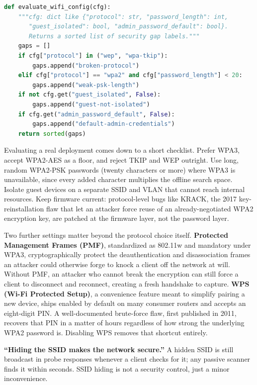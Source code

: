 \begin{lstlisting}[language=Python, caption={Evaluating a Wi-Fi configuration against baseline security criteria}]
def evaluate_wifi_config(cfg):
    """cfg: dict like {"protocol": str, "password_length": int,
       "guest_isolated": bool, "admin_password_default": bool}.
       Returns a sorted list of security gap labels."""
    gaps = []
    if cfg["protocol"] in ("wep", "wpa-tkip"):
        gaps.append("broken-protocol")
    elif cfg["protocol"] == "wpa2" and cfg["password_length"] < 20:
        gaps.append("weak-psk-length")
    if not cfg.get("guest_isolated", False):
        gaps.append("guest-not-isolated")
    if cfg.get("admin_password_default", False):
        gaps.append("default-admin-credentials")
    return sorted(gaps)
\end{lstlisting}

Evaluating a real deployment comes down to a short checklist. Prefer WPA3, accept WPA2-AES as a
floor, and reject TKIP and WEP outright. Use long, random WPA2-PSK passwords (twenty characters or
more) where WPA3 is unavailable, since every added character multiplies the offline search space.
Isolate guest devices on a separate SSID and VLAN that cannot reach internal resources. Keep
firmware current: protocol-level bugs like KRACK, the 2017 key-reinstallation flaw that let an
attacker force reuse of an already-negotiated WPA2 encryption key, are patched at the firmware
layer, not the password layer.

Two further settings matter beyond the protocol choice itself. \textbf{Protected Management Frames
(PMF)}, standardized as 802.11w and mandatory under WPA3, cryptographically protect the
deauthentication and disassociation frames an attacker could otherwise forge to knock a client off
the network at will. Without PMF, an attacker who cannot break the encryption can still force a
client to disconnect and reconnect, creating a fresh handshake to capture. \textbf{WPS (Wi-Fi
Protected Setup)}, a convenience feature meant to simplify pairing a new device, ships enabled by
default on many consumer routers and accepts an eight-digit PIN. A well-documented brute-force flaw,
first published in 2011, recovers that PIN in a matter of hours regardless of how strong the
underlying WPA2 password is. Disabling WPS removes that shortcut entirely.

\begin{misconception}
\textbf{``Hiding the SSID makes the network secure.''} A hidden SSID is still broadcast in probe
responses whenever a client checks for it; any passive scanner finds it within seconds. SSID
hiding is not a security control, just a minor inconvenience.
\end{misconception}

